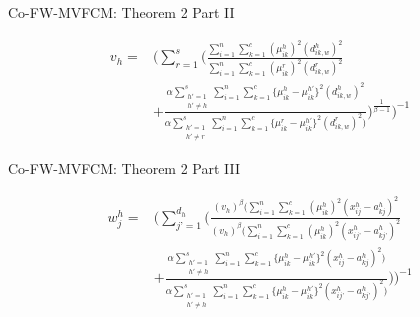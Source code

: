 \documentclass[compress,sky blue]{beamer}
\begin{document}
\begin{frame}{Co-FW-MVFCM: Theorem 2 Part II}

\begin{equation}
\begin{aligned}
v_{h}  ={} &  \Bigg ( \sum_{r=1}^{s} \bigg ( \frac { \sum_{i=1}^{n}\sum_{k=1}^{c} (\mu_{ik}^{h})^{2} (d_{ik,w}^{h})^{2} }  {\sum_{i=1}^{n}\sum_{k=1}^{c} (\mu_{ik}^{r})^{2} (d_{ik,w}^{r})^{2} }\\
      &  + \frac{\alpha \sum_{\substack{h'= 1\\ h'\ne h}}^{s} \sum_{i=1}^{n}\sum_{k=1}^{c}\{ \mu_{ik}^{h}-\mu_{ik}^{h'} \}^{2}(d_{ik,w}^{h})^{2} }  {\alpha \sum_{\substack{h'= 1\\ h'\ne r}}^{s}\sum_{i=1}^{n}\sum_{k=1}^{c}\{ \mu_{ik}^{r}-\mu_{ik}^{h'} \}^{2}(d_{ik,w}^{r})^{2}  \big )}  \bigg ) ^\frac{1}{\beta-1}\Bigg )^{-1}
\end{aligned}
\label{Theorem2V} 
\end{equation}

\end{frame}

\begin{frame}{Co-FW-MVFCM: Theorem 2 Part III}

\begin{equation}
\begin{aligned}
w_{j}^{h}  ={} & \Bigg ( \sum_{j’=1}^{d_{h}} \bigg ( \frac { (v_{h})^{\beta} \big ( \sum_{i=1}^{n}\sum_{k=1}^{c}(\mu_{ik}^{h})^{2}(x_{ij}^{h}-a_{kj}^{h})^{2}}  {(v_{h})^{\beta} \big ( \sum_{i=1}^{n}\sum_{k=1}^{c}(\mu_{ik}^{h})^{2}(x_{ij’}^{h}-a_{kj’}^{h})^{2} } \\
      &  + \frac {\alpha \sum_{\substack{h'= 1\\ h'\ne h}}^{s}\sum_{i=1}^{n}\sum_{k=1}^{c}\{ \mu_{ik}^{h}-\mu_{ik}^{h'} \}^{2} (x_{ij}^{h}-a_{kj}^{h})^{2}  \big ) } {\alpha  \sum_{\substack{h'= 1\\ h'\ne h}}^{s}\sum_{i=1}^{n}\sum_{k=1}^{c}\{ \mu_{ik}^{h}-\mu_{ik}^{h'} \}^{2} (x_{ij’}^{h}-a_{kj’}^{h})^{2}  \big )}  \bigg ) \Bigg )^{-1}
\end{aligned}
\label{Theorem2W} 
\end{equation}

\end{frame}
\end{document}
